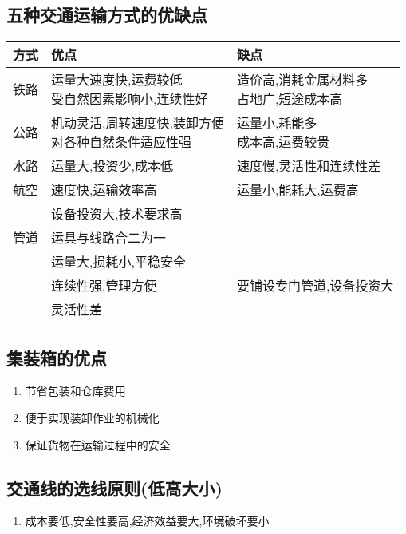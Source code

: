 \documentclass[a4paper]{article}
\begin{document}
    \subsection{五种交通运输方式的优缺点}
        \begin{tabular}{|c|l|l|}
            \hline
            方式   &   优点   &  缺点    \\
            \hline
            铁路   &   \makecell[l]{运量大速度快,运费较低 \\ 受自然因素影响小,连续性好}  &  \makecell[l]{造价高,消耗金属材料多 \\ 占地广,短途成本高} \\
            \hline
            公路   &    \makecell[l]{机动灵活,周转速度快,装卸方便 \\ 对各种自然条件适应性强} &  \makecell[l]{运量小,耗能多 \\ 成本高,运费较贵}   \\
            \hline
            水路   &   运量大,投资少,成本低    &    速度慢,灵活性和连续性差   \\
            \hline
            航空   &    速度快,运输效率高   &   运量小,能耗大,运费高 \\ & 设备投资大,技术要求高  \\
            \hline
            管道   &  运具与线路合二为一 \\ & 运量大,损耗小,平稳安全 \\ & 连续性强,管理方便   &    要铺设专门管道,设备投资大 \\ & 灵活性差   \\
            \hline
        \end{tabular}
    \subsection{集装箱的优点}
    \begin{enumerate}
        \item 节省包装和仓库费用
        \item 便于实现装卸作业的机械化
        \item 保证货物在运输过程中的安全
    \end{enumerate}
    \subsection{交通线的选线原则(低高大小)}
    \begin{enumerate}
        \item 成本要低,安全性要高,经济效益要大,环境破坏要小
    \end{enumerate}
\end{document}
